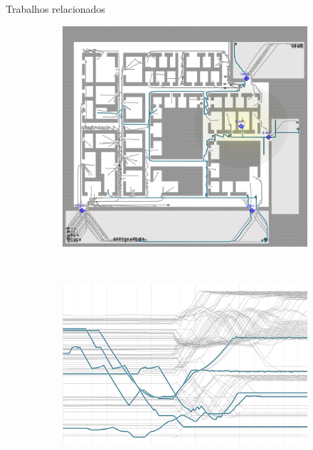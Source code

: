 \begin{frame}{Trabalhos relacionados}
\begin{figure}[ht!]
  \centering
  \begin{subfigure}[t]{0.45\textwidth}
    \centering
    \includegraphics[width=\textwidth]{../figuras/proximidade-espacial.png}
  \end{subfigure}
  ~
  \begin{subfigure}[t]{0.45\textwidth}
    \centering
    \includegraphics[width=\textwidth]{../figuras/proximidade-abstrata.png}
  \end{subfigure}
\end{figure}
\end{frame}


